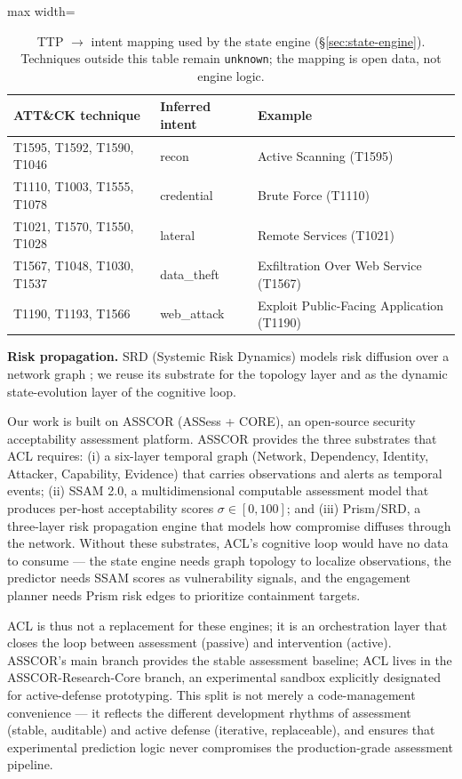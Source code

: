 \documentclass[11pt]{article}
\newcommand{\act}[1]{\texttt{#1}}
\begin{document}
\begin{table}[ht]
\centering
\begin{adjustbox}{max width=\linewidth}\begin{tabular}{@{}lll@{}}
\toprule
\textbf{ATT\&CK technique} & \textbf{Inferred intent} & \textbf{Example} \\
\midrule
T1595, T1592, T1590, T1046 & recon & Active Scanning (T1595) \\
T1110, T1003, T1555, T1078 & credential & Brute Force (T1110) \\
T1021, T1570, T1550, T1028 & lateral & Remote Services (T1021) \\
T1567, T1048, T1030, T1537 & data\_theft & Exfiltration Over Web Service (T1567) \\
T1190, T1193, T1566 & web\_attack & Exploit Public-Facing Application (T1190) \\
\bottomrule
\end{tabular}\end{adjustbox}
\caption{TTP $\rightarrow$ intent mapping used by the state engine
(\S\ref{sec:state-engine}). Techniques outside this table remain
\act{unknown}; the mapping is open data, not engine logic.}
\label{tab:ttp-intent}
\end{table}

\textbf{Risk propagation.} SRD (Systemic Risk Dynamics) models risk
diffusion over a network graph \cite{asscor-wp}; we reuse its substrate for
the topology layer and as the dynamic state-evolution layer of the
cognitive loop.

Our work is built on ASSCOR (ASSess + CORE), an open-source security acceptability assessment platform. ASSCOR provides the three substrates that ACL requires: (i) a six-layer temporal graph (Network, Dependency, Identity, Attacker, Capability, Evidence) that carries observations and alerts as temporal events; (ii) SSAM 2.0, a multidimensional computable assessment model that produces per-host acceptability scores $\sigma \in [0,100]$; and (iii) Prism/SRD, a three-layer risk propagation engine that models how compromise diffuses through the network. Without these substrates, ACL's cognitive loop would have no data to consume --- the state engine needs graph topology to localize observations, the predictor needs SSAM scores as vulnerability signals, and the engagement planner needs Prism risk edges to prioritize containment targets.

ACL is thus not a replacement for these engines; it is an orchestration layer that closes the loop between assessment (passive) and intervention (active). ASSCOR's main branch provides the stable assessment baseline; ACL lives in the ASSCOR-Research-Core branch, an experimental sandbox explicitly designated for active-defense prototyping. This split is not merely a code-management convenience --- it reflects the different development rhythms of assessment (stable, auditable) and active defense (iterative, replaceable), and ensures that experimental prediction logic never compromises the production-grade assessment pipeline.
\end{document}
